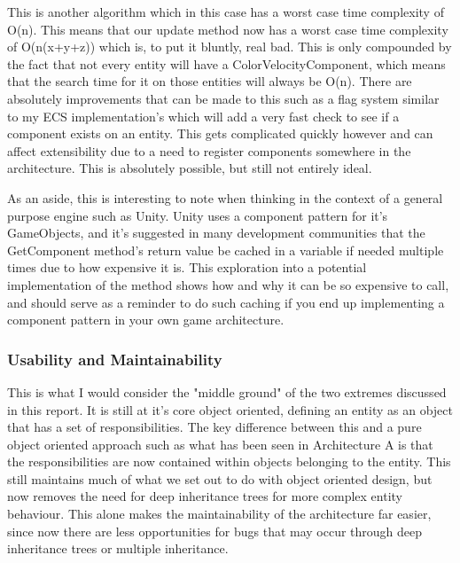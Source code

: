 \documentclass{article}
\begin{document}
\bigskip

This is another algorithm which in this case has a worst case time complexity
of O(n). This means that our update method now has a worst case time complexity
of O(n(x+y+z)) which is, to put it bluntly, real bad. This is only compounded by
the fact that not every entity will have a ColorVelocityComponent, which means
that the search time for it on those entities will always be O(n). There are
absolutely improvements that can be made to this such as a flag system similar
to my ECS implementation's which will add a very fast check to see if a
component exists on an entity. This gets complicated quickly however and can
affect extensibility due to a need to register components somewhere in the
architecture. This is absolutely possible, but still not entirely ideal.

As an aside, this is interesting to note when thinking in the context of a
general purpose engine such as Unity. Unity uses a component pattern for it's
GameObjects, and it's suggested in many development communities that the
GetComponent method's return value be cached in a variable if needed multiple
times due to how expensive it is. This exploration into a potential
implementation of the method shows how and why it can be so expensive to call,
and should serve as a reminder to do such caching if you end up implementing a
component pattern in your own game architecture.

\subsubsection{Usability and Maintainability}
This is what I would consider the "middle ground" of the two extremes discussed
in this report. It is still at it's core object oriented, defining an entity as
an object that has a set of responsibilities. The key difference between this
and a pure object oriented approach such as what has been seen in Architecture A
is that the responsibilities are now contained within objects belonging to the
entity. This still maintains much of what we set out to do with object oriented
design, but now removes the need for deep inheritance trees for more complex
entity behaviour. This alone makes the maintainability of the architecture far
easier, since now there are less opportunities for bugs that may occur through
deep inheritance trees or multiple inheritance.
\end{document}
